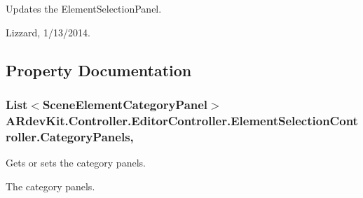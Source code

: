Updates the Element\-Selection\-Panel. 

Lizzard, 1/13/2014. 

\subsection{Property Documentation}
\hypertarget{class_a_rdev_kit_1_1_controller_1_1_editor_controller_1_1_element_selection_controller_a23dae11ee466555e6be598481a3459f2}{
\subsubsection[{Category\-Panels}]{\setlength{\rightskip}{0pt plus 5cm}List$<${\bf Scene\-Element\-Category\-Panel}$>$ A\-Rdev\-Kit.\-Controller.\-Editor\-Controller.\-Element\-Selection\-Controller.\-Category\-Panels\hspace{0.3cm}{\ttfamily [get]}, {\ttfamily [set]}}}\label{class_a_rdev_kit_1_1_controller_1_1_editor_controller_1_1_element_selection_controller_a23dae11ee466555e6be598481a3459f2}


Gets or sets the category panels. 

The category panels. 